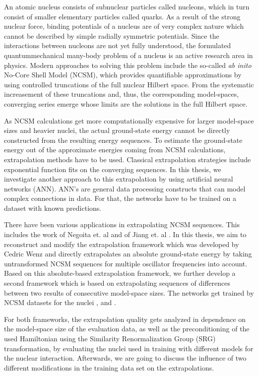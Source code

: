 An atomic nucleus consists of subnuclear particles called nucleons, which in turn consist of smaller elementary particles called quarks. As a result of the strong nuclear force, binding potentials of a nucleus are of very complex nature which cannot be described by simple radially symmetric potentials. Since the interactions between nucleons are not yet fully understood, the formulated quantummechanical many-body problem of a nucleus is an active research area in physics. Modern approaches to solving this problem include the so-called \textit{ab inito} No-Core Shell Model (NCSM), which provides quantifiable approximations by using controlled truncations of the full nuclear Hilbert space. From the systematic increasement of these truncations and, thus, the corresponding model-spaces, converging series emerge whose limits are the solutions in the full Hilbert space.

As NCSM calculations get more computationally expensive for larger model-space sizes and heavier nuclei, the actual ground-state energy cannot be directly constructed from the resulting energy sequences. To estimate the ground-state energy out of the approximate energies coming from NCSM calculations, extrapolation methods have to be used. Classical extrapolation strategies include exponential function fits on the converging sequences. In this thesis, we investigate another approach to this extrapolation by using artificial neural networks (ANN). ANN's are general data processing constructs that can model complex connections in data. For that, the networks have to be trained on a dataset with known predictions.

There have been various applications in extrapolating NCSM sequences. This includes the work of Negoita et. al \cite{neg} and of Jiang et. al \cite{2019}. In this thesis, we aim to reconstruct and modify the extrapolation framework which was developed by Cedric Wenz \cite{cedric} and directly extrapolates an absolute ground-state energy by taking untransformed NCSM sequences for multiple oscillator frequencies into account. Based on this absolute-based extrapolation framework, we further develop a second framework which is based on extrapolating sequences of differences between two results of consecutive model-space sizes. The networks get trained by NCSM datasets for the nuclei ,  and .

For both frameworks, the extrapolation quality gets analyzed in dependence on the model-space size of the evaluation data, as well as the preconditioning of the used Hamiltonian using the Similarity Renormalization Group (SRG) transformation, by evaluating the nuclei used in training with different models for the nuclear interaction. Afterwards, we are going to discuss the influence of two different modifications in the training data set on the extrapolations.

